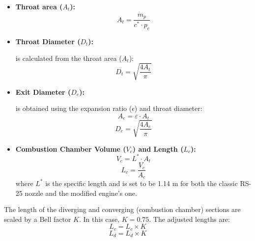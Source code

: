         \begin{itemize}
        \item\textbf {Throat area (\(A_t\)):}
        \begin{equation}
A_t = \frac{\dot{m}_p}{c^* \cdot p_c}
\label{eq:throat_area}
\end{equation}
            \item\textbf {Throat Diameter (\(D_t\)):} 
            
            is calculated from the throat area (\(A_t\)):
            \begin{equation}
            D_t = \sqrt{\frac{4 A_t}{\pi}}
            \end{equation}
            
            \item \textbf{Exit Diameter (\(D_e\)):}
            
            is obtained using the expansion ratio (\(\epsilon\)) and throat diameter:
            \begin{equation}
            A_e = \varepsilon \cdot A_t
            \end{equation}
            \begin{equation}
            D_e = \sqrt{\frac{4 A_e}{\pi}}
            \end{equation}
            
            \item \textbf{Combustion Chamber Volume (\(V_c\)) and Length (\(L_c\)):}
            \begin{equation}
            V_c = L^* \cdot A_t
            \end{equation}
            \begin{equation}
            L_c = \frac{V_c}{A_c}
            \end{equation}
            where \(L^*\) is the specific length and is set to be 1.14 m \cite{sutton01} for both the classic RS-25 nozzle and the modified engine's one.
    \end{itemize}
              The length of the diverging and converging (combustion chamber) sections are scaled by a Bell factor \(K\). In this case, \(K = 0.75\). The adjusted lengths are:
    \begin{equation}
    L_c = L_c \times K
    \end{equation}
    \begin{equation}
    L_d = L_d \times K
    \end{equation}

